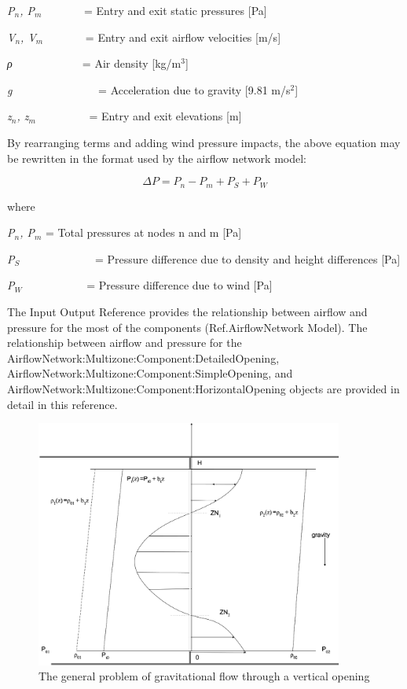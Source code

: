 \emph{P\(_{n}\), P\(_{m}\)}~~~~~~~ = Entry and exit static pressures {[}Pa{]}

\emph{V\(_{n}\), V\(_{m}\)}~~~~~~~ = Entry and exit airflow velocities {[}m/s{]}

\emph{ρ~~~}~~~~~~~~~ = Air density {[}kg/m\(^{3}\){]}

\emph{g}~~~~~~~~~~~~~~~ = Acceleration due to gravity {[}9.81 m/s\(^{2}\){]}

\emph{z\(_{n}\), z\(_{m}\)}~~~~~~~~~ = Entry and exit elevations {[}m{]}

By rearranging terms and adding wind pressure impacts, the above equation may be rewritten in the format used by the airflow network model:

\begin{equation}
\Delta P = {P_n} - {P_m} + {P_S} + {P_W}
\end{equation}

where

\emph{P\(_{n}\), P\(_{m}\)} = Total pressures at nodes n and m {[}Pa{]}

\emph{P\(_{S}\)}~~~~~~~~~~~~~ = Pressure difference due to density and height differences {[}Pa{]}

\emph{P\(_{W}\)}~~~~~~~~~~~ = Pressure difference due to wind {[}Pa{]}

The Input Output Reference provides the relationship between airflow and pressure for the most of the components (Ref.AirflowNetwork Model). The relationship between airflow and pressure for the AirflowNetwork:Multizone:Component:DetailedOpening, AirflowNetwork:Multizone:Component:SimpleOpening, and Air\-flow\-Net\-work:\-Multi\-zone:\-Com\-ponent:\-Horizontal\-Opening objects are provided in detail in this reference.

\begin{figure}[hbtp] %
\centering
\includegraphics[width=0.9\textwidth, height=0.9\textheight, keepaspectratio=true]{media/image2691.svg.png}
\caption{The general problem of gravitational flow through a vertical opening \protect \label{fig:the-general-problem-of-gravitational-flow}}
\end{figure}

